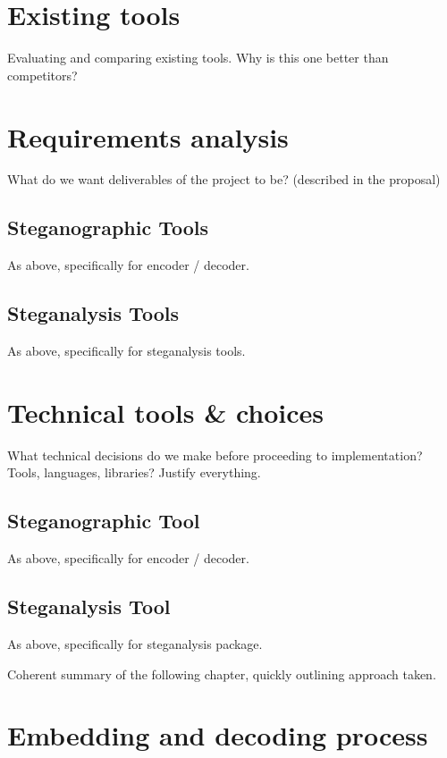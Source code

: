 \documentclass[12pt,british,twoside,notitlepage,usenames,dvipsnames,hypens,final]{report}
\numberwithin{equation}{section}
\numberwithin{figure}{section}
\begin{document}
\section{Existing tools}

Evaluating and comparing existing tools. Why is this one better than competitors?

\section{Requirements analysis}

What do we want deliverables of the project to be? (described in the proposal)

\subsection{Steganographic Tools}

As above, specifically for encoder / decoder.

\subsection{Steganalysis Tools}

As above, specifically for steganalysis tools.

\section{Technical tools \& choices}

What technical decisions do we make before proceeding to implementation? Tools, languages, libraries? Justify everything.

\subsection{Steganographic Tool}

As above, specifically for encoder / decoder.

\subsection{Steganalysis Tool}

As above, specifically for steganalysis package.


Coherent summary of the following chapter, quickly outlining approach taken.

\section{Embedding and decoding process}
\end{document}
